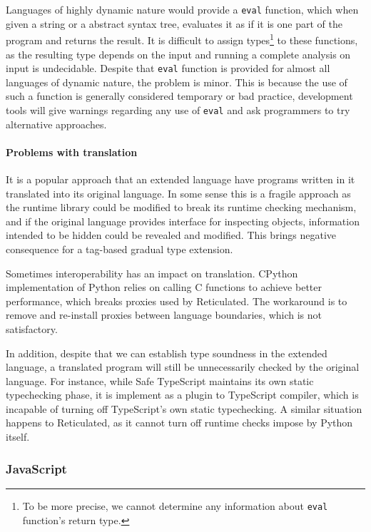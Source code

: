 Languages of highly dynamic nature would provide a \texttt{eval} function,
which when given a string or a abstract syntax tree, evaluates it as
if it is one part of the program and returns the result.
It is difficult to assign types\footnote{To be more precise,
we cannot determine any information about \texttt{eval} function's return type.
} to these functions, as
the resulting type depends on the input and running
a complete analysis on input is undecidable.
Despite that \texttt{eval} function is provided
for almost all languages of dynamic nature, the problem is minor.
This is because the use of such a function is generally considered
temporary or bad practice, development tools will give warnings
regarding any use of \texttt{eval} and ask programmers to try alternative approaches.

\paragraph{Problems with translation}
It is a popular approach that an extended language have programs
written in it translated into its original language.
In some sense this is a fragile approach as the runtime library
could be modified to break its runtime checking mechanism,
and if the original language provides interface for inspecting
objects, information intended to be hidden could be
revealed and modified. This brings negative consequence for a tag-based
gradual type extension.

Sometimes interoperability has an impact on translation.
CPython implementation of Python relies on calling C functions to
achieve better performance, which breaks proxies used by Reticulated.
The workaround is to remove and re-install proxies
between language boundaries, which is not satisfactory.

In addition,
despite that we can establish type soundness in the extended language,
a translated program will still be unnecessarily checked by the original language.
For instance,
while Safe TypeScript maintains its own static typechecking phase,
it is implement as a plugin to TypeScript compiler,
which is incapable of turning off TypeScript's own static typechecking.
A similar situation happens to Reticulated, as it cannot turn off
runtime checks impose by Python itself.

\subsubsection{JavaScript}

